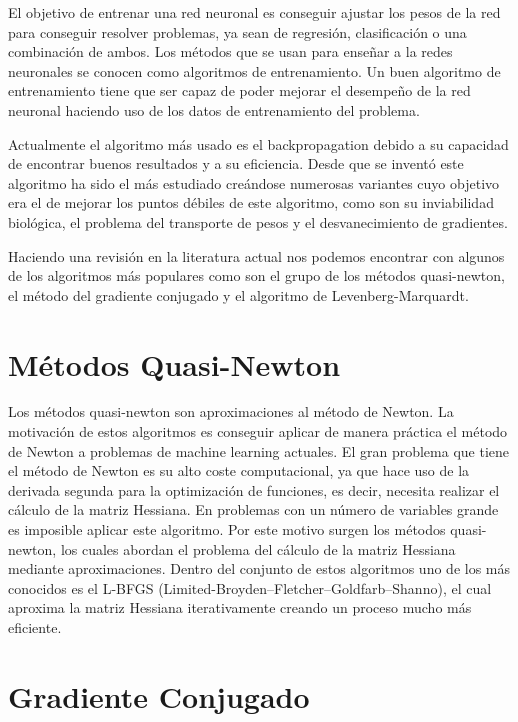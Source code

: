 El objetivo de entrenar una red neuronal es conseguir ajustar los pesos de la red para conseguir resolver problemas, ya sean de regresión, clasificación o una combinación de ambos. Los métodos que se usan para enseñar a la redes neuronales se conocen como algoritmos de entrenamiento. Un buen algoritmo de entrenamiento tiene que ser capaz de poder mejorar el desempeño de la red neuronal haciendo uso de los datos de entrenamiento del problema.

Actualmente el algoritmo más usado es el backpropagation \cite{RefWorks:RefID:6-rumelhart1986learning} debido a su capacidad de encontrar buenos resultados y a su eficiencia. Desde que se inventó este algoritmo ha sido el más estudiado creándose numerosas variantes cuyo objetivo era el de mejorar los puntos débiles de este algoritmo, como son su inviabilidad biológica, el problema del transporte de pesos \cite{RefWorks:RefID:10-grossberg1987competitive} y el desvanecimiento de gradientes.

Haciendo una revisión en la literatura actual nos podemos encontrar con algunos de los algoritmos más populares como son el grupo de los métodos quasi-newton, el método del gradiente conjugado\cite{RefWorks:RefID:13-johansson1991backpropagation} y el algoritmo de Levenberg-Marquardt\cite{yu2011levenberg}.

\section{Métodos Quasi-Newton}

Los métodos quasi-newton son aproximaciones al método de Newton. La motivación de estos algoritmos es conseguir aplicar de manera práctica el método de Newton a problemas de machine learning actuales. El gran problema que tiene el método de Newton es su alto coste computacional, ya que hace uso de la derivada segunda para la optimización de funciones, es decir, necesita realizar el cálculo de la matriz Hessiana. En problemas con un número de variables grande es imposible aplicar este algoritmo. Por este motivo surgen los métodos quasi-newton, los cuales abordan el problema del cálculo de la matriz Hessiana mediante aproximaciones. Dentro del conjunto de estos algoritmos uno de los más conocidos es el L-BFGS \cite{RefWorks:RefID:12-rafati2018improving} (Limited-Broyden–Fletcher–Goldfarb–Shanno), el cual aproxima la matriz Hessiana iterativamente creando un proceso mucho más eficiente. 

\section{Gradiente Conjugado}

